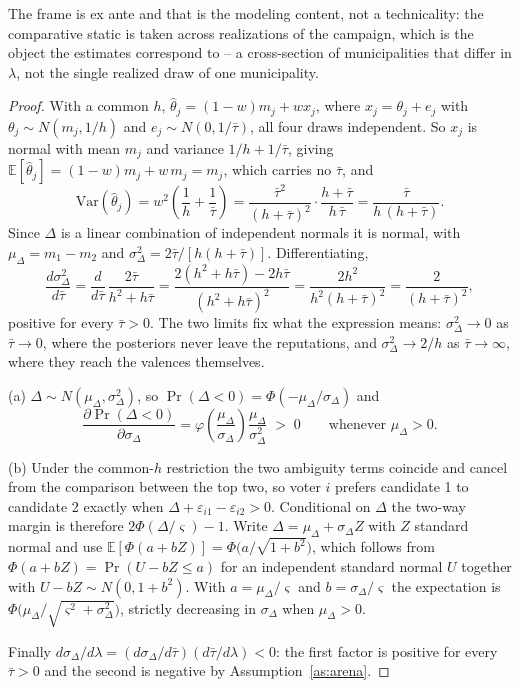 \documentclass[11pt]{article}
\theoremstyle{definition}
\theoremstyle{remark}
\begin{document}
The frame is ex ante and that is the modeling content, not a technicality: the
comparative static is taken across realizations of the campaign, which is the
object the estimates correspond to -- a cross-section of municipalities that
differ in $\lambda$, not the single realized draw of one municipality.

\begin{proof}
With a common $h$, $\hat\theta_j = (1-w)m_j + w x_j$, where
$x_j = \theta_j + e_j$ with $\theta_j \sim N(m_j, 1/h)$ and
$e_j \sim N(0, 1/\bar\tau)$, all four draws independent. So $x_j$ is normal
with mean $m_j$ and variance $1/h + 1/\bar\tau$, giving
$\mathbb{E}[\hat\theta_j] = (1-w)m_j + w\,m_j = m_j$, which carries no
$\bar\tau$, and
\[
  \mathrm{Var}(\hat\theta_j)
  = w^2\left(\frac{1}{h} + \frac{1}{\bar\tau}\right)
  = \frac{\bar\tau^2}{(h+\bar\tau)^2}\cdot\frac{h+\bar\tau}{h\,\bar\tau}
  = \frac{\bar\tau}{h\,(h+\bar\tau)} .
\]
Since $\Delta$ is a linear combination of independent normals it is normal,
with $\mu_\Delta = m_1 - m_2$ and
$\sigma^2_\Delta = 2\bar\tau/[h(h+\bar\tau)]$. Differentiating,
\[
  \frac{d\sigma^2_\Delta}{d\bar\tau}
  = \frac{d}{d\bar\tau}\,\frac{2\bar\tau}{h^2 + h\bar\tau}
  = \frac{2(h^2 + h\bar\tau) - 2h\bar\tau}{(h^2 + h\bar\tau)^2}
  = \frac{2h^2}{h^2(h+\bar\tau)^2}
  = \frac{2}{(h+\bar\tau)^2},
\]
positive for every $\bar\tau > 0$. The two limits fix what the expression
means: $\sigma^2_\Delta \to 0$ as $\bar\tau \to 0$, where the posteriors never
leave the reputations, and $\sigma^2_\Delta \to 2/h$ as $\bar\tau \to \infty$,
where they reach the valences themselves.

(a) $\Delta \sim N(\mu_\Delta, \sigma^2_\Delta)$, so
$\Pr(\Delta<0) = \Phi(-\mu_\Delta/\sigma_\Delta)$ and
\[
  \frac{\partial \Pr(\Delta<0)}{\partial\sigma_\Delta}
  = \varphi\!\left(\frac{\mu_\Delta}{\sigma_\Delta}\right)
    \frac{\mu_\Delta}{\sigma^2_\Delta} \;>\; 0
  \qquad\text{whenever } \mu_\Delta > 0 .
\]

(b) Under the common-$h$ restriction the two ambiguity terms coincide and
cancel from the comparison between the top two, so voter $i$ prefers candidate
1 to candidate 2 exactly when $\Delta + \varepsilon_{i1} - \varepsilon_{i2} >
0$. Conditional on $\Delta$ the two-way margin is therefore
$2\Phi(\Delta/\varsigma) - 1$. Write $\Delta = \mu_\Delta + \sigma_\Delta Z$
with $Z$ standard normal and use
$\mathbb{E}[\Phi(a + bZ)] = \Phi\bigl(a/\sqrt{1+b^2}\bigr)$, which follows
from $\Phi(a+bZ) = \Pr(U - bZ \le a)$ for an independent standard normal $U$
together with $U - bZ \sim N(0, 1+b^2)$. With $a = \mu_\Delta/\varsigma$ and
$b = \sigma_\Delta/\varsigma$ the expectation is
$\Phi\bigl(\mu_\Delta/\sqrt{\varsigma^2+\sigma^2_\Delta}\bigr)$, strictly
decreasing in $\sigma_\Delta$ when $\mu_\Delta > 0$.

Finally $d\sigma_\Delta/d\lambda
= (d\sigma_\Delta/d\bar\tau)(d\bar\tau/d\lambda) < 0$: the first factor is
positive for every $\bar\tau > 0$ and the second is negative by
Assumption~\ref{as:arena}.
\end{proof}
\end{document}
